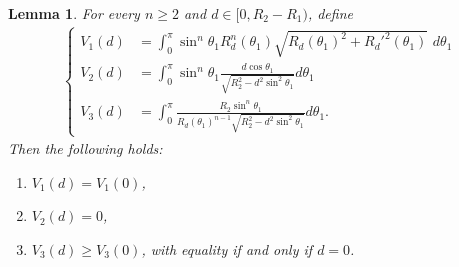 \documentclass[12pt,reqno]{amsart}
\newtheorem{definition}{Definition}[section]
\newtheorem{lemma}{Lemma}[section]
\numberwithin{equation}{section}
\numberwithin{theorem}{section}
\numberwithin{equation}{section}
\numberwithin{theorem}{section}
\begin{document}
\begin{lemma}\label{V comparison}
    For every $n \geq 2$ and $d \in [0, R_2 - R_1)$,  define 
    \begin{align*}
        \begin{cases}
            V_1(d)&=\displaystyle\int _{0}^{\pi} \sin^n\theta_1 R_d^n(\theta_1) \sqrt{R_d(\theta_1)^2 + {R_{d}'^2(\theta_1)}} \,\, d\theta_1\\
            V_2(d) &= \displaystyle\int _{0}^{\pi} \sin^n\theta_1 \frac{d\cos\theta_1}{\sqrt{R_2^2-d^2\sin^2\theta_1}} d\theta_1\\
            V_3(d)&=\displaystyle\int_0^{\pi} \frac{R_2 \sin^n\theta_1}{R_d(\theta_1)^{n-1} \sqrt{R_2^2-d^2\sin^2\theta_1}}d\theta_1.
        \end{cases}
    \end{align*}
    Then the following holds: 
    \begin{enumerate}
    \item $V_1(d) = V_1(0)$,
    \item $V_2(d) = 0$,
    \item $V_3(d) \geq V_3(0)$, with equality if and only if $d =0$.
\end{enumerate}
\end{lemma}
\noindent
 


\end{document}
